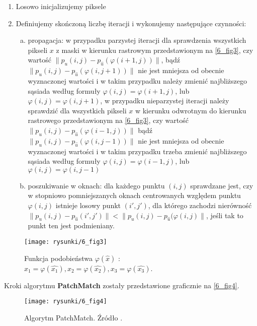 \documentclass[12pt, twoside, openany]{report}
\theoremstyle{definition}
\begin{document}
\begin{enumerate}
\item
Losowo inicjalizujemy piksele
\item
Definiujemy skończoną liczbę iteracji i wykonujemy następujące czynności:
\begin{enumerate}[a)]
\item
propagacja: w przypadku parzystej iteracji dla sprawdzenia wszystkich pikseli $x$ z maski w kierunku rastrowym przedstawionym na \autoref{6_fig3}, czy 
wartość $\big\| p_u(i,j) - p_{\hat{u}}(\varphi(i+1,j)) \big\|$, bądź $\big\| p_{u}(i,j) - p_{\hat{u}}(\varphi(i,j+1)) \big\|$ nie jest mniejsza od obecnie wyznaczonej wartości i w takim przypadku należy zmienić najbliższego sąsiada według formuły $\varphi(i,j) = \varphi(i+1,j)$, lub $\varphi(i,j) = \varphi(i,j+1)$, 
w przypadku nieparzystej iteracji należy sprawdzić dla wszystkich pikseli $x$ w kierunku odwrotnym do kierunku rastrowego przedstawionym na \autoref{6_fig3}, czy 
wartość $\big\| p_{u}(i,j) - p_{\hat{u}}(\varphi(i-1,j)) \big\|$ bądź $\big\| p_{u}(i,j) - p_{\hat{u}}(\varphi(i,j-1)) \big\|$ nie jest mniejsza od obecnie wyznaczonej wartości i w takim przypadku trzeba zmienić najbliższego sąsiada według formuły $\varphi(i,j) = \varphi(i-1,j)$, lub $\varphi(i,j) = \varphi(i,j-1)$
\item
poszukiwanie w oknach: dla każdego punktu $(i,j)$ sprawdzane jest, czy w stopniowo pomniejszanych oknach centrowanych względem punktu $\varphi(i,j)$ istnieje losowy punkt $(i', j')$, dla którego zachodzi nierówność $\big\| p_{u}(i,j) - p_{\hat{u}}(i',j') \big\| < \big\| p_{u}(i,j) - p_{\hat{u}}(\varphi(i,j) \big\|$, jeśli tak to punkt ten jest podmieniany.
\end{enumerate}
\end{enumerate}
\begin{figure}[!h]
	\centering
	\texttt{[image: rysunki/6\_fig3]}
	\caption{Funkcja podobieństwa $\varphi(\hat{x})$ : $x_1 = \varphi(\hat{x_1}), x_2 = \varphi(\hat{x_2}), x_3 = \varphi(\hat{x_3})$.}
	\label{6_fig3}
\end{figure}
Kroki algorytmu \textbf{PatchMatch} zostały przedstawione graficznie na \autoref{6_fig4}.
\begin{figure}[!h]
	\centering
	\texttt{[image: rysunki/6\_fig4]}
	\caption{Algorytm PatchMatch. Źródło \cite{arias2011variational}.}
	\label{6_fig4}
\end{figure}
\end{document}
